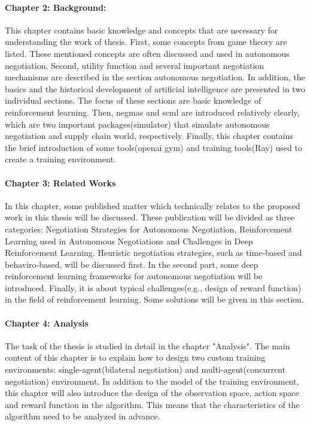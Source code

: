 \paragraph{Chapter 2: Background:}
This chapter contains basic knowledge and concepts that are necessary for understanding the work of thesis. First, some concepts from game theory are listed. These mentioned concepts are often discussed and used in autonomous negotiation. Second, utility function and several important negotiation mechanisms are described in the section autonomous negotiation. In addition, the basics and the historical development of artificial intelligence are presented in two individual sections. The focus of these sections are basic knowledge of reinforcement learning. Then, \gls{negmas} and \gls{scml} are introduced relatively clearly, which are two important packages(simulator) that simulate autonomous negotiation and supply chain world, respectively. Finally, this chapter contains the brief introduction of some tools(\gls{openai gym}) and training tools(Ray) used to create a training environment.

\paragraph{Chapter 3: Related Works}
In this chapter, some published matter which technically relates to the proposed work in this thesis will be discussed. These publication will be divided as three categories: Negotiation Strategies for Autonomous Negotiation, Reinforcement Learning used in Autonomous Negotiations and Challenges in Deep Reinforcement Learning. Heuristic negotiation strategies, such as time-based and behaviro-based, will be discussed first. In the second part, some deep reinforcement learning frameworks for autonomous negotiation will be introduced. Finally, it is about typical challenges(e.g., design of reward function) in the field of reinforcement learning. Some solutions will be given in this section.

\paragraph{Chapter 4: Analysis}
The task of the thesis is studied in detail in the chapter "Analysis". The main content of this chapter is to explain how to design two custom training environments: single-agent(bilateral negotiation) and multi-agent(concurrent negotiation) environment. In addition to the model of the training environment, this chapter will also introduce the design of the observation space, action space and reward function in the algorithm.
This means that the characteristics of the algorithm need to be analyzed in advance.

